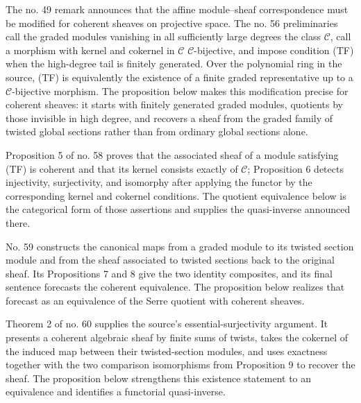 \begin{proposition}
\label{proposition-coherent-modules-on-proj}
\begin{reference}
\cite[Chapter II, \S 4, no. 49, Remark 2, p. 242]{FAC}
\cite[Chapter III, \S 2, no. 56, class $\mathcal{C}$ and condition (TF),
p. 249]{FAC}
\cite[Chapter III, \S 2, no. 58, Propositions 5 and 6,
pp. 250--251]{FAC}
\cite[Chapter III, \S 2, no. 59, comparison maps and forecast,
pp. 251--252]{FAC}
\cite[Chapter III, \S 2, no. 60, Proposition 9 and Theorem 2,
pp. 252--253]{FAC}
\cite[Chapter III, \S 3, no. 65, Propositions 5 and 6,
p. 258]{FAC}
\end{reference}
\begin{history}
The no. 49 remark announces that the affine module--sheaf correspondence
must be modified for coherent sheaves on projective space. The no. 56
preliminaries call the graded modules vanishing in all sufficiently large
degrees the class $\mathcal{C}$, call a morphism with kernel and cokernel in
$\mathcal{C}$ $\mathcal{C}$-bijective, and impose condition (TF) when the
high-degree tail is finitely generated. Over the polynomial ring in the
source, (TF) is equivalently the existence of a finite graded representative
up to a $\mathcal{C}$-bijective morphism. The proposition below makes this
modification precise for coherent sheaves: it starts with finitely generated
graded modules, quotients by those invisible in high degree, and recovers a
sheaf from the graded family of twisted global sections rather than from
ordinary global sections alone.

Proposition 5 of no. 58 proves that the associated sheaf of a module
satisfying (TF) is coherent and that its kernel consists exactly of
$\mathcal{C}$; Proposition 6 detects injectivity, surjectivity, and
isomorphy after applying the functor by the corresponding kernel and
cokernel conditions. The quotient equivalence below is the categorical
form of those assertions and supplies the quasi-inverse announced there.

No. 59 constructs the canonical maps from a graded module to its twisted
section module and from the sheaf associated to twisted sections back to
the original sheaf. Its Propositions 7 and 8 give the two identity
composites, and its final sentence forecasts the coherent equivalence.
The proposition below realizes that forecast as an equivalence of the
Serre quotient with coherent sheaves.

Theorem 2 of no. 60 supplies the source's essential-surjectivity argument.
It presents a coherent algebraic sheaf by finite sums of twists, takes the
cokernel of the induced map between their twisted-section modules, and uses
exactness together with the two comparison isomorphisms from Proposition 9
to recover the sheaf. The proposition below strengthens this existence
statement to an equivalence and identifies a functorial quasi-inverse.


\end{history}
\end{proposition}
